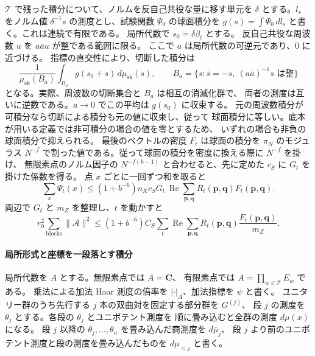 \(\mathcal T\) で残った積分について、ノルムを反自己共役な量に移す単元を
\(\delta\) とする。\(l_s\) をノルム値 \(\delta^{-1}s\) の測度とし、試験関数
\(\Psi_0\) の球面積分を \(g(s)=\int\Psi_0\,dl_s\) と書く。これは連続で有限である。
局所代数で \(s_0=\delta\beta_t\) とする。
反自己共役な周波数 \(u\) を \(a\bar a u\) が整である範囲に限る。
ここで \(a\) は局所代数の可逆元であり、\(0\) に近づける。
指標の直交性により、切断した積分は
\[
 \frac{1}{\mu_\mathrm{sk}(B_a)}
       \int_{B_a}g(s_0+s)\,d\mu_\mathrm{sk}(s),\qquad
 B_a=\{s:\bar s=-s,\ (a\bar a)^{-1}s\text{ は整}\}
\]
となる。実際、周波数の切断集合と \(B_a\) は相互の消滅化群で、
両者の測度は互いに逆数である。\(a\to0\) でこの平均は \(g(s_0)\) に収束する。
元の周波数積分が可積分なら切断による積分も元の値に収束し、従って
球面積分に等しい。底本が用いる定義では非可積分の場合の値を零とするため、
いずれの場合も非負の球面積分で抑えられる。
最後のベクトルの密度 \(F_t\) は球面の積分を \(\pi_N\) のモジュラス
\(N^{-f}\) で割った値である。従って球面の積分を密度に換える際に \(N^{-f}\) を掛け、
無限素点のノルム因子の \(N^{-f(k-1)}\) と合わせると、先に定めた \(c_S\) に \(G_t\) を掛けた係数を得る。
点 \(x\) ごとに一回ずつ和を取ると
\[
 \sum_x\Psi_t(x)\le(1+b^{-6})n_Xc_S G_t\,
             \operatorname{Re}\sum_{\mathbf p,\mathbf q}R_t(\mathbf p,\mathbf q)
                                                       F_t(\mathbf p,\mathbf q).
\]
両辺で \(G_t\) と \(m_Z\) を整理し、\(t\) を動かすと
\begin{equation}\label{eq:span-siegel-sum}
 r_0^2\sum_{\mathrm{blocks}}\|\mathcal A\|^2
 \le (1+b^{-6})C_S\sum_t\operatorname{Re}\sum_{\mathbf p,\mathbf q}
                         R_t(\mathbf p,\mathbf q)\frac{F_t(\mathbf p,\mathbf q)}{m_Z}.
\end{equation}

\paragraph{局所形式と座標を一段落とす積分}\label{par:span-local-transform}
局所代数を \(A\) とする。無限素点では \(A=\mathbf C\)、
有限素点では \(A=\prod_{w\in\mathcal T}E_w\) である。
乗法による加法 Haar 測度の倍率を \(|\cdot|_A\)、加法指標を \(\psi\) と書く。
ユニタリー群のうち先行する \(j\) 本の双曲対を固定する部分群を \(G^{(j)}\)、
段 \(j\) の測度を \(\theta_j\) とする。各段の \(\theta_j\) とユニポテント測度を
順に畳み込むと全群の測度 \(d\mu(x)\) になる。
段 \(j\) 以降の \(\theta_j,\ldots,\theta_n\) を畳み込んだ商測度を \(d\bar\mu_j\)、
段 \(j\) より前のユニポテント測度と段の測度を畳み込んだものを \(d\mu_{<j}\) と書く。

